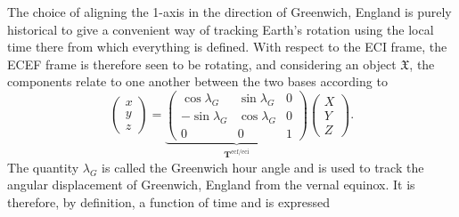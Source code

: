 \documentclass[11pt,dvipsnames]{thesis}
\begin{document}
\noindent The choice of aligning the 1-axis in the direction of Greenwich, England is purely historical to give a convenient way of tracking Earth's rotation using the local time there from which everything is defined. With respect to the ECI frame, the ECEF frame is therefore seen to be rotating, and considering an object $\mathfrak{X}$, the components relate to one another between the two bases according to
\begin{equation}
\begin{pmatrix}x \\ y \\ z\end{pmatrix} = \underbrace{\begin{pmatrix}\cos\lambda_G & \sin\lambda_G & 0 \\ -\sin\lambda_G & \cos\lambda_G & 0 \\ 0 & 0 & 1\end{pmatrix}}_{\mathbf{T}^{\text{ecf}/\text{eci}}} \begin{pmatrix}X \\ Y \\ Z\end{pmatrix}.
\end{equation}
The quantity $\lambda_G$ is called the Greenwich hour angle and is used to track the angular displacement of Greenwich, England from the vernal equinox. It is therefore, by definition, a function of time and is expressed
\end{document}
